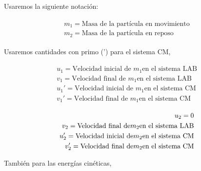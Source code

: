 \documentclass[a4paper,10pt]{article}
\begin{document}
\vspace{.3cm}

Usaremos la siguiente notación:

 \begin{gather}
 \begin{split}
% 
  m_1 = \text{Masa de la partícula en movimiento} \\
  m_2 = \text{Masa de la partícula en reposo}
%  
  \label{eq:masas}
%  
 \end{split}
 \end{gather}

Usaremos cantidades con primo (') para el sistema CM,

 \begin{gather}
 \begin{split}
  u_1 = \text{Velocidad inicial de } m_1 \text{en el sistema LAB} \\
  v_1 = \text{Velocidad final de } m_1 \text{en el sistema LAB} \\
%   
  u_1' = \text{Velocidad inicial de } m_1 \text{en el sistema CM} \\
  v_1' = \text{Velocidad final de } m_1 \text{en el sistema CM}
% 
 \label{eq:velMasa1}
 \end{split}
 \end{gather}

  \begin{gather}
  \begin{split}
   u_2 = 0 \\
   v_2 = \textrm{Velocidad final de} m_2 \textrm{en el sistema LAB} \\
%  
 \vspace{.2cm}
%  
  u_2' = \textrm{Velocidad inicial de} m_2 \textrm{en el sistema CM} \\
  v_2' = \textrm{Velocidad final de} m_2 \textrm{en el sistema CM}
%  
  \label{eq:velMasa2}
  \end{split}
 \end{gather}
 
También para las energías cinéticas,
 
\end{document}
